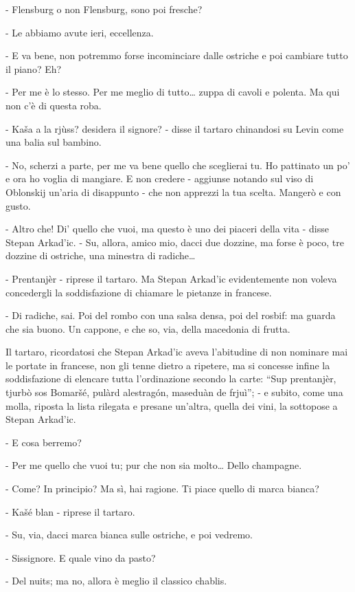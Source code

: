 - Flensburg o non Flensburg, sono poi fresche? 

- Le abbiamo avute ieri, eccellenza. 

- E va bene, non potremmo forse incominciare dalle ostriche e poi cambiare tutto il piano? Eh? 

- Per me è lo stesso. Per me meglio di tutto\ldots{} zuppa di cavoli e polenta. Ma qui non c'è di questa roba. 

- Kaša a la rjùss? desidera il signore? - disse il tartaro chinandosi su Levin come una balia sul bambino. 

- No, scherzi a parte, per me va bene quello che sceglierai tu. Ho pattinato un po' e ora ho voglia di mangiare. E non credere - aggiunse notando sul viso di Oblonskij un'aria di disappunto - che non apprezzi la tua scelta. Mangerò e con gusto. 

- Altro che! Di' quello che vuoi, ma questo è uno dei piaceri della vita - disse Stepan Arkad'ic. - Su, allora, amico mio, dacci due dozzine, ma forse è poco, tre dozzine di ostriche, una minestra di radiche\ldots{} 

- Prentanjèr - riprese il tartaro. Ma Stepan Arkad'ic evidentemente non voleva concedergli la soddisfazione di chiamare le pietanze in francese. 

- Di radiche, sai. Poi del rombo con una salsa densa, poi del rosbif: ma guarda che sia buono. Un cappone, e che so, via, della macedonia di frutta. 

Il tartaro, ricordatosi che Stepan Arkad'ic aveva l'abitudine di non nominare mai le portate in francese, non gli tenne dietro a ripetere, ma si concesse infine la soddisfazione di elencare tutta l'ordinazione secondo la carte: ``Sup prentanjèr, tjurbò sos Bomaršé, pulàrd alestragón, maseduàn de frjuì''; - e subito, come una molla, riposta la lista rilegata e presane un'altra, quella dei vini, la sottopose a Stepan Arkad'ic. 

- E cosa berremo? 

- Per me quello che vuoi tu; pur che non sia molto\ldots{} Dello champagne. 

- Come? In principio? Ma sì, hai ragione. Ti piace quello di marca bianca? 

- Kašé blan - riprese il tartaro. 

- Su, via, dacci marca bianca sulle ostriche, e poi vedremo. 

- Sissignore. E quale vino da pasto? 

- Del nuits; ma no, allora è meglio il classico chablis. 

